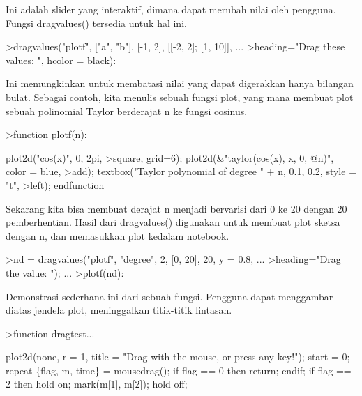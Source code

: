 \documentclass[a4paper,10pt]{article}
\begin{document}
\begin{eulernotebook}
\begin{eulercomment}
\begin{eulercomment}
\begin{eulercomment}
\begin{eulercomment}
\begin{eulercomment}
Ini adalah slider yang interaktif, dimana dapat merubah nilai oleh
pengguna. Fungsi dragvalues() tersedia untuk hal ini.
\end{eulercomment}
\begin{eulerprompt}
>dragvalues("plotf", ["a", "b"], [-1, 2], [[-2, 2]; [1, 10]], ...
>heading="Drag these values: ", hcolor = black):
\end{eulerprompt}
\begin{eulercomment}
Ini memungkinkan untuk membatasi nilai yang dapat digerakkan hanya
bilangan bulat. Sebagai contoh, kita menulis sebuah fungsi plot, yang
mana membuat plot sebuah polinomial Taylor berderajat n ke fungsi
cosinus.
\end{eulercomment}
\begin{eulerprompt}
>function plotf(n):
\end{eulerprompt}
\begin{eulerudf}
     plot2d("cos(x)", 0, 2pi, >square, grid=6);
     plot2d(&"taylor(cos(x), x, 0, @n)", color = blue, >add);
     textbox("Taylor polynomial of degree " + n, 0.1, 0.2, style = "t", >left);
  endfunction
\end{eulerudf}
\begin{eulercomment}
Sekarang kita bisa membuat derajat n menjadi bervarisi dari 0 ke 20
dengan 20 pemberhentian. Hasil dari dragvalues() digunakan untuk
membuat plot sketsa dengan n, dan memasukkan plot kedalam notebook.
\end{eulercomment}
\begin{eulerprompt}
>nd = dragvalues("plotf", "degree", 2, [0, 20], 20, y = 0.8, ...
>heading="Drag the value: "); ...
>plotf(nd):
\end{eulerprompt}
\begin{eulercomment}
Demonstrasi sederhana ini dari sebuah fungsi. Pengguna dapat
menggambar diatas jendela plot, meninggalkan titik-titik lintasan.
\end{eulercomment}
\begin{eulerprompt}
>function dragtest...
\end{eulerprompt}
\begin{eulerudf}
     plot2d(none, r = 1, title = "Drag with the mouse, or press any key!");
     start = 0;
     repeat
         \{flag, m, time\} = mousedrag();
         if flag == 0 then return; endif;
         if flag == 2 then
             hold on; mark(m[1], m[2]); hold off;

\end{eulerudf}
\end{eulercomment}
\end{eulercomment}
\end{eulercomment}
\end{eulercomment}
\end{eulernotebook}
\end{document}
